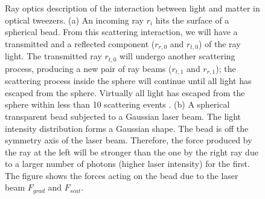 \documentclass[letterpaper,12pt,oneside]{book}
\begin{document}
\begin{figure}[H]
    \caption{Ray optics description of the interaction between light and matter in optical tweezers. (a) An incoming ray $r_i$ hits the surface of a spherical bead. From this scattering interaction, we will have a transmitted and a reflected component ($r_{r,0}$ and $r_{t,0}$) of the ray light. The transmitted ray $r_{t,0}$ will undergo another scattering process, producing a new pair of ray beams ($r_{t,1}$ and $r_{r,1}$); the scattering process inside the sphere will continue until all light has escaped from the sphere. Virtually all light has escaped from the sphere within less than 10 scattering events \cite{jones2015optical}. \newline (b) A spherical transparent bead subjected to a Gaussian laser beam. The light intensity distribution forms a Gaussian shape. The bead is off the symmetry axis of the laser beam. Therefore, the force produced by the ray at the left will be stronger than the one by the right ray due to a larger number of photons (higher laser intensity) for the first. The figure shows the forces acting on the bead due to the laser beam $F_{grad}$ and $F_{scat}$. 
 }%
    \label{opticaltweezerfunctioning}%
\end{figure}
\end{document}
